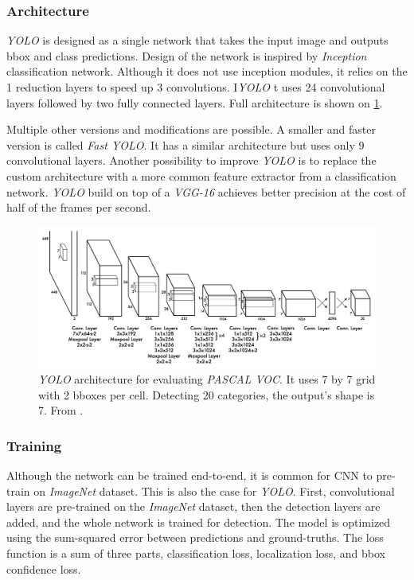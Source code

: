 \subsubsection{Architecture} 
\textit{YOLO} is designed as a single network that takes the input image and outputs bbox and class predictions. Design of the network is inspired by \textit{Inception} classification network. Although it does not use inception modules, it relies on the 1 reduction layers to speed up 3 convolutions. I\textit{YOLO} t uses 24 convolutional layers followed by two fully connected layers. Full architecture is shown on \cref{fig:yolo}. 

Multiple other versions and modifications are possible. A smaller and faster version is called \textit{Fast YOLO}. It has a similar architecture but uses only 9 convolutional layers. Another possibility to improve \textit{YOLO} is to replace the custom architecture with a more common feature extractor from a classification network. \textit{YOLO} build on top of a \textit{VGG-16} achieves better precision at the cost of half of the frames per second.

\begin{figure}
    \centering
    \includegraphics[width=\textwidth]{img/yoylo}
    \caption[YOLO architecture]%
    {\textit{YOLO} architecture for evaluating \textit{PASCAL VOC}. It uses 7 by 7 grid with 2 bboxes per cell. Detecting 20 categories, the output's shape is 7. From \cite[fig. 3]{bib:yolo}.}
    \label{fig:yolo} 
\end{figure}

\subsubsection{Training}
Although the network can be trained end-to-end, it is common for CNN to pre-train on \textit{ImageNet} dataset. This is also the case for \textit{YOLO}. First, convolutional layers are pre-trained on the \textit{ImageNet} dataset, then the detection layers are added, and the whole network is trained for detection. The model is optimized using the sum-squared error between predictions and ground-truths. The loss function is a sum of three parts, classification loss, localization loss, and bbox confidence loss. 

